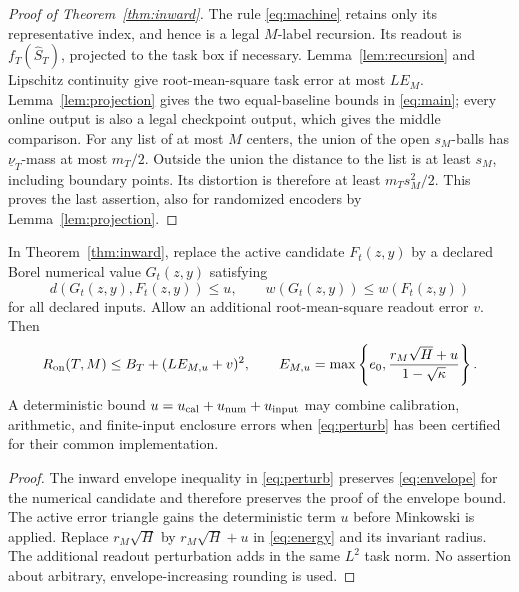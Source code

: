\begin{proof}[Proof of Theorem~\ref{thm:inward}]
The rule \eqref{eq:machine} retains only its representative index, and hence is a legal $M$-label recursion. Its readout is $f_T(\widehat S_T)$, projected to the task box if necessary. Lemma~\ref{lem:recursion} and Lipschitz continuity give root-mean-square task error at most $LE_M$. Lemma~\ref{lem:projection} gives the two equal-baseline bounds in \eqref{eq:main}; every online output is also a legal checkpoint output, which gives the middle comparison. For any list of at most $M$ centers, the union of the open $s_M$-balls has $\underline\nu_T$-mass at most $m_T/2$. Outside the union the distance to the list is at least $s_M$, including boundary points. Its distortion is therefore at least $m_Ts_M^2/2$. This proves the last assertion, also for randomized encoders by Lemma~\ref{lem:projection}.
\end{proof}

\begin{corollary}\label{cor:perturb}
In Theorem~\ref{thm:inward}, replace the active candidate $F_t(z,y)$ by a declared Borel numerical value $G_t(z,y)$ satisfying
\begin{equation}\label{eq:perturb}
 d(G_t(z,y),F_t(z,y))\le u,
 \qquad w(G_t(z,y))\le w(F_t(z,y))
\end{equation}
for all declared inputs. Allow an additional root-mean-square readout error $v$. Then
\[
 R_{\mathrm{on}}(T,M)\le B_T+(L E_{M,u}+v)^2,
 \qquad
 E_{M,u}=\max\left\{e_0,
        \frac{r_M\sqrt H+u}{1-\sqrt\kappa}\right\}.
\]
A deterministic bound $u=u_{\rm cal}+u_{\rm num}+u_{\rm input}$ may combine calibration, arithmetic, and finite-input enclosure errors when \eqref{eq:perturb} has been certified for their common implementation.
\end{corollary}
\begin{proof}
The inward envelope inequality in \eqref{eq:perturb} preserves \eqref{eq:envelope} for the numerical candidate and therefore preserves the proof of the envelope bound. The active error triangle gains the deterministic term $u$ before Minkowski is applied. Replace $r_M\sqrt H$ by $r_M\sqrt H+u$ in \eqref{eq:energy} and its invariant radius. The additional readout perturbation adds in the same $L^2$ task norm. No assertion about arbitrary, envelope-increasing rounding is used.
\end{proof}
